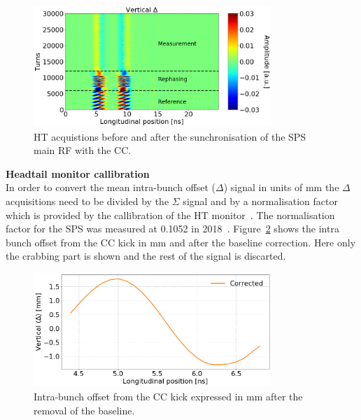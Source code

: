 \begin{figure}[!h]
   \centering         
   \includegraphics[width=0.8\textwidth]{images/Ch4/HT_measures_vs_reference_vs_corrected__20180530_135105_baseline_correction_onlyDelta.png}
       \caption{HT acquistions before and after the sunchronisation of the SPS main RF with the CC.}
       \label{fig:HT_baseline_correction_measurements_2D}
\end{figure}


\normalsize{\textbf{Headtail monitor callibration}}\\
In order to convert the mean intra-bunch offset ($\Delta$) signal in units of mm the $\Delta$ acquisitions need to be divided by the $\Sigma$ signal and by a normalisation factor which is provided by the callibration of the HT monitor~\cite{PhysRevAccelBeams.22.112803}. The normalisation factor for the SPS was measured at 0.1052 in 2018~\cite{HT_calibration_2018}. Figure~\ref{fig:HT_baseline_correction_crabbing_mm} shows the intra bunch offset from the CC kick in mm and after the baseline correction. Here only the crabbing part is shown and the rest of the signal is discarted.


\begin{figure}[!h]
   \centering         
   \includegraphics[width=0.8\textwidth]{images/Ch4/HT_measures_vs_reference_vs_corrected__20180530_135105_baseline_correction_mm.png}
       \caption{Intra-bunch offset from the CC kick expressed in mm after the removal of the baseline.}
       \label{fig:HT_baseline_correction_crabbing_mm}
\end{figure}


